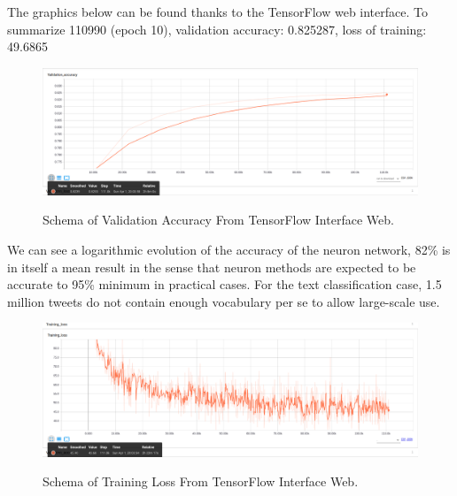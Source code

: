 \documentclass{acmtog} %
\begin{document}
The graphics below can be found thanks to the TensorFlow web interface.
To summarize 110990 (epoch 10), validation accuracy: 0.825287, loss of training: 49.6865

\begin{figure}[H]
{\includegraphics[width=\linewidth]{validation-accuracy.png}}
\caption{Schema of Validation Accuracy From TensorFlow Interface Web.}
  \label{fig:archivedb}
\end{figure}

We can see a logarithmic evolution of the accuracy of the neuron network, 82\% is in itself a mean result in the sense that neuron methods are expected to be accurate to 95\% minimum in practical cases. For the text classification case, 1.5 million tweets do not contain enough vocabulary per se to allow large-scale use.

\begin{figure}[H]
{\includegraphics[width=\linewidth]{training-loss.png}}
\caption{Schema of Training Loss From TensorFlow Interface Web.}
  \label{fig:archivedb}
\end{figure}
\end{document}
